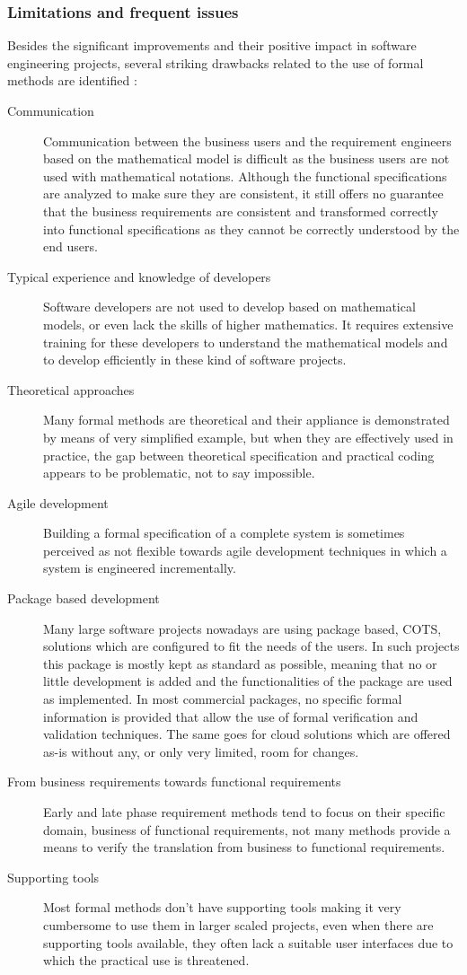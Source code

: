 \subsubsection{Limitations and frequent issues}
\label{sec:drawbacks}
Besides the significant improvements and their positive impact in software engineering projects, several striking drawbacks related to the use of formal methods are identified :
\begin{description}
	\item[Communication] Communication between the business users and the requirement engineers based on the mathematical model is difficult as the business users are not used with mathematical notations. Although the functional specifications are analyzed to make sure they are consistent, it still offers no guarantee that the business requirements are consistent and transformed correctly into functional specifications as they cannot be correctly understood by the end users.
	\item[Typical experience and knowledge of developers] Software developers are not used to develop based on mathematical models, or even lack the skills of higher mathematics. It requires extensive training for these developers to understand the mathematical models and to develop efficiently in these kind of software projects.
	\item[Theoretical approaches] Many formal methods are theoretical and their appliance is demonstrated by means of very simplified example, but when they are effectively used in practice, the gap between theoretical specification and practical coding appears to be problematic, not to say impossible.
	\item[Agile development] Building a formal specification of a complete system is sometimes perceived as not flexible towards agile development techniques in which a system is engineered incrementally. 
	\item[Package based development] Many large software projects nowadays are using package based, COTS, solutions which are configured to fit the needs of the users. In such projects this package is mostly kept as standard as possible, meaning that no or little development is added and the functionalities of the package are used as implemented. In most commercial packages, no specific formal information is provided that allow the use of formal verification and validation techniques. The same goes for cloud solutions which are offered as-is without any, or only very limited, room for changes.
	\item[From business requirements towards functional requirements]Early and late phase requirement methods tend to focus on their specific domain, business of functional requirements, not many methods provide a means to verify the translation from business to functional requirements.
	\item[Supporting tools] Most formal methods don't have supporting tools making it very cumbersome to use them in larger scaled projects, even when there are supporting tools available, they often lack a suitable user interfaces due to which the practical use is threatened.


\end{description}
